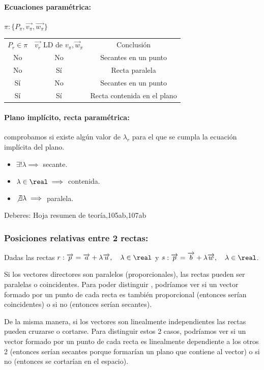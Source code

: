 \paragraph{Ecuaciones paramétrica: } $\pi: \{P_{\pi},\vec{v_{\pi}}, \vec{w_{\pi}}\}$ 

\begin{center}
\begin{tabular}{ccc}
$P_r \in \pi $ & $\vec{v_r}$ LD de $v_{\pi}, \vec{w}_{\pi}$ & Conclusión\\
No & No & Secantes en un punto\\
No & Sí & Recta paralela\\
Sí & No & Secantes en un punto\\
Sí & Sí & Recta contenida en el plano\\
\end{tabular}
\end{center}

\paragraph{Plano implícito, recta paramétrica: } comprobamos si existe algún valor de $\lambda_{r}$ para el que se cumpla la ecuación implícita del plano. 
\begin{itemize}
  \item $\exists!\lambda \implies $ secante.
  \item $\lambda \in \real \implies$ contenida.
  \item $\not\exists \lambda \implies $ paralela.
\end{itemize}

Deberes: Hoja resumen de teoría,105ab,107ab

\subsubsection{Posiciones relativas entre 2 rectas:}

Dadas las rectas 
$r:\vec{p} = \vec{a} + \lambda\vec{u},\quad \lambda\in\real$
y
$s:\vec{p} = \vec{b} + \lambda\vec{w},\quad \lambda\in\real$. 

Si los vectores directores son paralelos (proporcionales), las rectas pueden ser paralelas o coincidentes. 
%
Para poder distinguir , podríamos ver si un vector formado por un punto de cada recta es también proporcional (entonces serían coincidentes) o si no (entonces serían secantes).

De la misma manera, si los vectores son linealmente independientes las rectas pueden cruzarse o cortarse. 
%
Para distinguir estos 2 casos, podríamos ver si un vector formado por un punto de cada recta es linealmente dependiente a los otros 2 (entonces serían secantes porque formarían un plano que contiene al vector) o si no (entonces se cortarían en el espacio).

